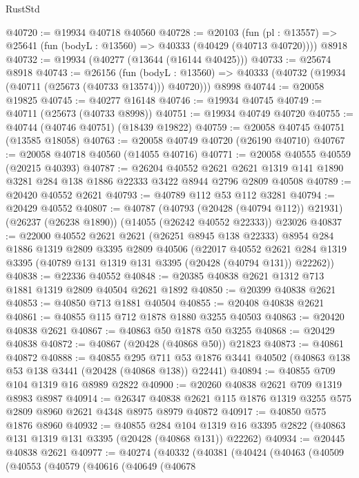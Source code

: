 \begin{lexlean}{RustStd}
\begin{coremodule}
@40720 := @19934 @40718 @40560
@40728 := @20103
    (fun (pl : @13557) => @25641 (fun (bodyL : @13560) => @40333 (@40429 (@40713 @40720))))
    @8918
@40732 := @19934 (@40277 (@13644 (@16144 @40425)))
@40733 := @25674 @8918
@40743 := @26156
    (fun (bodyL : @13560) => @40333 (@40732 (@19934 (@40711 (@25673 (@40733 @13574))) @40720)))
    @8998
@40744 := @20058 @19825
@40745 := @40277 @16148
@40746 := @19934 @40745
@40749 := @40711 (@25673 (@40733 @8998))
@40751 := @19934 @40749 @40720
@40755 := @40744 (@40746 @40751) (@18439 @19822)
@40759 := @20058 @40745 @40751 (@13585 @18058)
@40763 := @20058 @40749 @40720 (@26190 @40710)
@40767 := @20058 @40718 @40560 (@14055 @40716)
@40771 := @20058 @40555 @40559 (@20215 @40393)
@40787 := @26204
    @40552
    @2621
    @2621
    @1319
    @141
    @1890
    @3281
    @284
    @138
    @1886
    @22333
    @3422
    @8944
    @2796
    @2809
    @40508
@40789 := @20420 @40552 @2621
@40793 := @40789 @112 @53 @112 @3281
@40794 := @20429 @40552
@40807 := @40787
    (@40793 (@20428 (@40794 @112)) @21931)
    (@26237 (@26238 @1890))
    (@14055 (@26242 @40552 @22333))
    @23026
@40837 := @22000
    @40552
    @2621
    @2621
    (@26251 @8945 @138 @22333)
    @8954
    @284
    @1886
    @1319
    @2809
    @3395
    @2809
    @40506
    (@22017
      @40552
      @2621
      @284
      @1319
      @3395
      (@40789 @131 @1319 @131 @3395 (@20428 (@40794 @131)) @22262))
@40838 := @22336 @40552
@40848 := @20385 @40838 @2621 @1312 @713 @1881 @1319 @2809 @40504 @2621 @1892
@40850 := @20399 @40838 @2621
@40853 := @40850 @713 @1881 @40504
@40855 := @20408 @40838 @2621
@40861 := @40855 @115 @712 @1878 @1880 @3255 @40503
@40863 := @20420 @40838 @2621
@40867 := @40863 @50 @1878 @50 @3255
@40868 := @20429 @40838
@40872 := @40867 (@20428 (@40868 @50)) @21823
@40873 := @40861 @40872
@40888 := @40855
    @295
    @711
    @53
    @1876
    @3441
    @40502
    (@40863 @138 @53 @138 @3441 (@20428 (@40868 @138)) @22441)
@40894 := @40855 @709 @104 @1319 @16 @8989 @2822
@40900 := @20260 @40838 @2621 @709 @1319 @8983 @8987
@40914 := @26347 @40838 @2621 @115 @1876 @1319 @3255 @575 @2809 @8960 @2621 @4348 @8975 @8979 @40872
@40917 := @40850 @575 @1876 @8960
@40932 := @40855
    @284
    @104
    @1319
    @16
    @3395
    @2822
    (@40863 @131 @1319 @131 @3395 (@20428 (@40868 @131)) @22262)
@40934 := @20445 @40838 @2621
@40977 := @40274
    (@40332
      (@40381
        (@40424
          (@40463
            (@40509
              (@40553
                (@40579
                  (@40616
                    (@40649
                      (@40678

\end{coremodule}
\end{lexlean}
